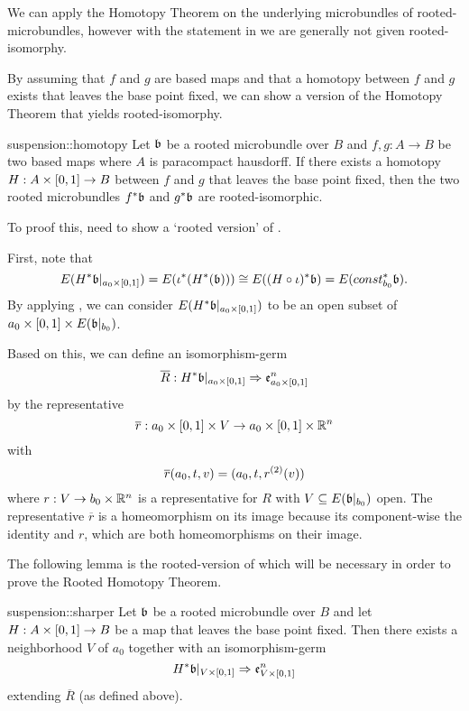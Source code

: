 \begin{myparagraph}
    We can apply the Homotopy Theorem on the underlying microbundles of
    rooted-microbundles, however with the statement in 
    we are generally not given rooted-isomorphy.

    By assuming that $f$ and $g$ are based maps and that a homotopy
    between $f$ and $g$ exists that leaves the base point fixed,
    we can show a version of the Homotopy Theorem that yields rooted-isomorphy.
\end{myparagraph}

\begin{mytheorem}{suspension::homotopy}{}
    Let $\mathfrak{b}$ be a rooted microbundle over $B$ and $f, g: A \to B$ be two based maps
    where $A$ is paracompact hausdorff.
    If there exists a homotopy $H: A \times{} [0, 1] \to B$ between $f$ and $g$ that leaves the base point fixed,
    then the two rooted microbundles $f^*\mathfrak{b}$ and $g^*\mathfrak{b}$ are rooted-isomorphic.
\end{mytheorem}

\begin{myparagraph}
    To proof this, need to show a `rooted version' of .
    
    First, note that 
    \[
        E(H^*\mathfrak{b}\vert_{a_0 \times{} [0, 1]}) = E(\iota^*(H^*(\mathfrak{b})))
        \cong E((H \circ \iota)^*\mathfrak{b}) = E(const_{b_0}^*\mathfrak{b}).
    \]
    By applying , we can consider $E(H^*\mathfrak{b}\vert_{a_0 \times{} [0, 1]})$
    to be an open subset of $a_0 \times [0, 1] \times E(\mathfrak{b}\vert_{b_0})$.

    Based on this, we can define an isomorphism-germ
    \[ \overline{R}: H^*\mathfrak{b}\vert_{a_0 \times{} [0, 1]} \Rightarrow{} \mathfrak{e}^{n}_{a_0 \times{} [0, 1]} \]
    by the representative
    \[ \overline{r}: a_0 \times{} [0, 1] \times V \to a_0 \times{} [0, 1] \times \mathbb{R}^n \]
    with
    \[ \overline{r}(a_0, t, v) = (a_0, t, r^{(2)}(v) )\]
    where $r: V \to b_0 \times \mathbb{R}^n$ is a representative for $R$ with $V \subseteq{} E(\mathfrak{b}\vert_{b_0})$ open.
    The representative $\overline{r}$ is a homeomorphism on its image
    because its component-wise the identity and $r$, which are both homeomorphisms on their image. 

    The following lemma is the rooted-version of 
    which will be necessary in order to prove the Rooted Homotopy Theorem.
\end{myparagraph}

\begin{mylemma}{suspension::sharper}{}
    Let $\mathfrak{b}$ be a rooted microbundle over $B$ and
    let $H: A \times{} [0, 1] \to B$ be a map that leaves the base point fixed.
    Then there exists a neighborhood $V$ of $a_0$ together with an isomorphism-germ
    \[ H^*\mathfrak{b}\vert_{V \times{} [0, 1]} \Rightarrow{} \mathfrak{e}^{n}_{V \times{} [0, 1]} \]
    extending $\overline{R}$ (as defined above).
\end{mylemma}

